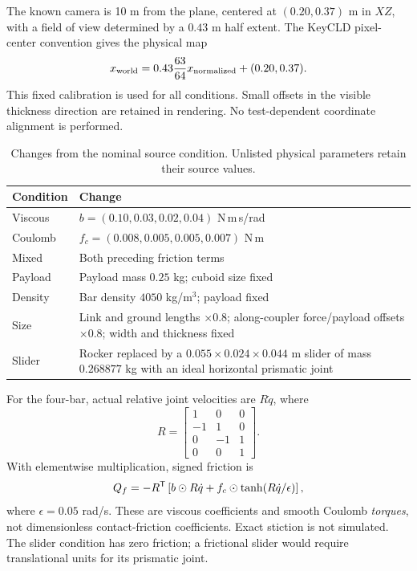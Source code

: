The known camera is 10 m from the plane, centered at $(0.20,0.37)$ m in $XZ$, with a field of view determined by a $0.43$ m half extent. The KeyCLD pixel-center convention gives the physical map
\begin{equation}
x_{\rm world}=0.43\frac{63}{64}x_{\rm normalized}
+(0.20,0.37).
\end{equation}
This fixed calibration is used for all conditions. Small offsets in the visible thickness direction are retained in rendering. No test-dependent coordinate alignment is performed.

\begin{table}[t]
\caption{Changes from the nominal source condition. Unlisted physical parameters retain their source values.}
\label{app:conditions}
\centering
\small
\begin{tabular}{lp{}}
\toprule
Condition & Change\\
\midrule
Viscous & $b=(0.10,0.03,0.02,0.04)$ N\,m\,s/rad\\
Coulomb & $f_c=(0.008,0.005,0.005,0.007)$ N\,m\\
Mixed & Both preceding friction terms\\
Payload & Payload mass $0.25$ kg; cuboid size fixed\\
Density & Bar density $4050$ kg/m$^3$; payload fixed\\
Size & Link and ground lengths $\times0.8$; along-coupler force/payload offsets $\times0.8$; width and thickness fixed\\
Slider & Rocker replaced by a $0.055\times0.024\times0.044$ m slider of mass $0.268877$ kg with an ideal horizontal prismatic joint\\
\bottomrule
\end{tabular}
\end{table}

For the four-bar, actual relative joint velocities are $R\dot q$, where
\begin{equation}
R=\begin{bmatrix}
1&0&0\\-1&1&0\\0&-1&1\\0&0&1
\end{bmatrix}.
\end{equation}
With elementwise multiplication, signed friction is
\begin{equation}
Q_f=-R^{\mathsf T}\left[b\odot R\dot q+
f_c\odot\tanh(R\dot q/\epsilon)\right],
\end{equation}
where $\epsilon=0.05$ rad/s. These are viscous coefficients and smooth Coulomb \emph{torques}, not dimensionless contact-friction coefficients. Exact stiction is not simulated. The slider condition has zero friction; a frictional slider would require translational units for its prismatic joint.

